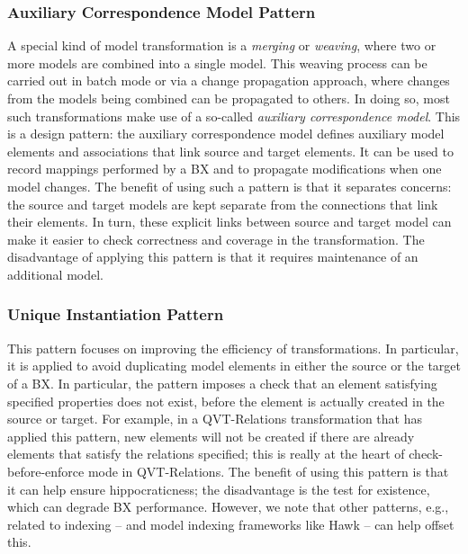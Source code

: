 \subsubsection{Auxiliary Correspondence Model Pattern}
A special kind of model transformation is a \textit{merging} or \textit{weaving}, where two or more models are combined into a single model. This weaving process can be carried out in batch mode or via a change propagation approach, where changes from the models being combined can be propagated to others. In doing so, most such transformations make use of a so-called \textit{auxiliary correspondence model}. This is a design pattern: the auxiliary correspondence model defines auxiliary model elements and associations that link source and target elements. It can be used to record mappings performed by a BX and to propagate modifications when one model changes. The benefit of using such a pattern is that it separates concerns: the source and target models are kept separate from the connections that link their elements. In turn, these explicit links between source and target model can make it easier to check correctness and coverage in the transformation. The disadvantage of applying this pattern is that it requires maintenance of an additional model.

\subsubsection{Unique Instantiation Pattern}
This pattern focuses on improving the efficiency of transformations. In particular, it is applied to avoid duplicating model elements in either the source or the target of a BX. In particular, the pattern imposes a check that an element satisfying specified properties does not exist, before the element is actually created in the source or target. For example, in a QVT-Relations transformation that has applied this pattern, new elements will not be created if there are already elements that satisfy the relations specified; this is really at the heart of check-before-enforce mode in QVT-Relations. The benefit of using this pattern is that it can help ensure hippocraticness; the disadvantage is the test for existence, which can degrade BX performance. However, we note that other patterns, e.g., related to indexing \cite{LanoKR14} -- and model indexing frameworks like Hawk -- can help offset this.

